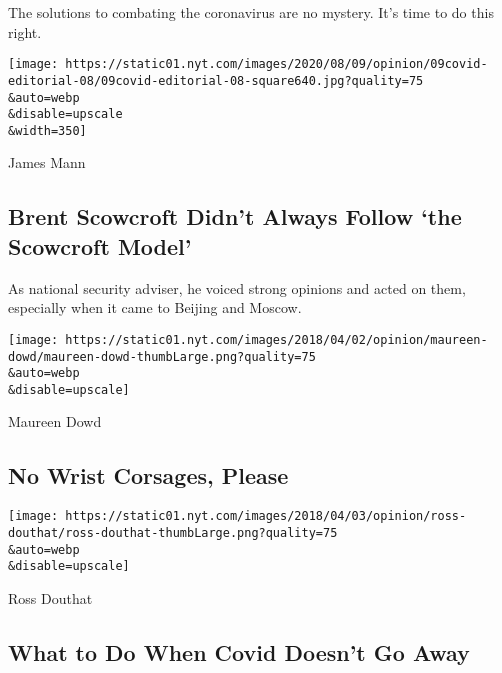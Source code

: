 The solutions to combating the coronavirus are no mystery. It's time to
do this right.

\href{/2020/08/08/opinion/sunday/coronavirus-response-testing-lockdown.html}{}

\texttt{[image: https://static01.nyt.com/images/2020/08/09/opinion/09covid-editorial-08/09covid-editorial-08-square640.jpg?quality=75\\\&auto=webp\\\&disable=upscale\\\&width=350]}

\href{/2020/08/08/opinion/brent-scowcroft-model-foreign-policy.html}{}

James Mann

\hypertarget{brent-scowcroft-didnt-always-follow-the-scowcroft-model}{%
\subsection{Brent Scowcroft Didn't Always Follow `the Scowcroft
Model'}\label{brent-scowcroft-didnt-always-follow-the-scowcroft-model}}

As national security adviser, he voiced strong opinions and acted on
them, especially when it came to Beijing and Moscow.

\href{/2020/08/08/opinion/sunday/biden-vice-president-geraldine-ferraro.html}{}

\texttt{[image: https://static01.nyt.com/images/2018/04/02/opinion/maureen-dowd/maureen-dowd-thumbLarge.png?quality=75\\\&auto=webp\\\&disable=upscale]}

Maureen Dowd

\hypertarget{no-wrist-corsages-please}{%
\subsection{No Wrist Corsages, Please}\label{no-wrist-corsages-please}}

\href{/2020/08/08/opinion/sunday/covid-lyme-treatment-medicine.html}{}

\texttt{[image: https://static01.nyt.com/images/2018/04/03/opinion/ross-douthat/ross-douthat-thumbLarge.png?quality=75\\\&auto=webp\\\&disable=upscale]}

Ross Douthat

\hypertarget{what-to-do-when-covid-doesnt-go-away}{%
\subsection{What to Do When Covid Doesn't Go
Away}\label{what-to-do-when-covid-doesnt-go-away}}

\href{/2020/08/08/opinion/sunday/crazy-blues-mamie-smith.html}{}

